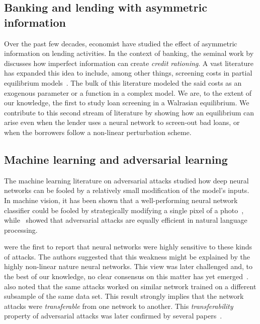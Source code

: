 \documentclass[12pt]{article} %
\begin{document}
\subsection{Banking and lending with asymmetric information}

Over the past few decades, economist have studied the effect of asymmetric information on lending activities. In the context of banking, the seminal work by~\cite{stiglitz1981credit} discusses how imperfect information can create \textit{credit rationing}. A vast literature has expanded this idea to include, among other things, screening costs in partial equilibrium models~\citep[see, e.g.,][]{de1987too,broecker1990credit,freixas2007interbank}. The bulk of this literature modeled the said costs as an exogenous parameter or a function in a complex model. We are, to the extent of our knowledge, the first to study loan screening in a Walrasian equilibrium. We contribute to this second stream of literature by showing how an equilibrium can arise even when the lender uses a neural network to screen-out bad loans, or when the borrowers follow a non-linear perturbation scheme.


\subsection{Machine learning and adversarial learning}

The machine learning literature on adversarial attacks studied how deep neural networks can be fooled by a relatively small modification of the model's inputs. In machine vision, it has been shown that a well-performing neural network classifier could be fooled by strategically modifying a single pixel of a photo~\citep[see, e.g.,][]{su2019one}, while~\cite{liang2017deep} showed that adversarial attacks are equally efficient in natural language processing. 

\cite{szegedy2013intriguing} were the first to report that neural networks were highly sensitive to these kinds of attacks. The authors suggested that this weakness might be explained by the highly non-linear nature neural networks. This view was later challenged and, to the best of our knowledge, no clear consensus on this matter has yet emerged~\citep[see, e.g.,][]{goodfellow2014explaining}.~\cite{szegedy2013intriguing} also noted that the same attacks worked on similar network trained on a different subsample of the same data set. This result strongly implies that the network attacks were \textit{transferable} from one network to another. This \textit{transferability} property of adversarial attacks was later confirmed by several papers~\citep[see, e.g.,][]{goodfellow2014explaining,papernot2017practical}. 
\end{document}
